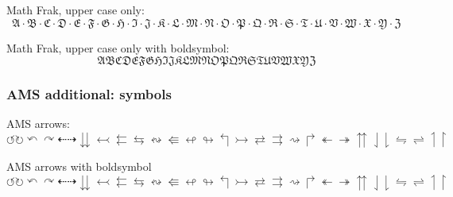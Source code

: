 \documentclass[12pt,a4paper]{article}
\theoremstyle{clearprint}
\begin{document}
\noindent
Math Frak, upper case only:
\begin{equation}
\mathfrak{A} \cdot \mathfrak{B} \cdot \mathfrak{C} \cdot \mathfrak{D} \cdot \mathfrak{E} \cdot \mathfrak{F} \cdot \mathfrak{G} \cdot \mathfrak{H} \cdot \mathfrak{I} \cdot \mathfrak{J} \cdot \mathfrak{K} \cdot \mathfrak{L} \cdot \mathfrak{M} \cdot \mathfrak{N} \cdot \mathfrak{O} \cdot \mathfrak{P} \cdot \mathfrak{Q} \cdot \mathfrak{R} \cdot \mathfrak{S} \cdot \mathfrak{T} \cdot \mathfrak{U} \cdot \mathfrak{V} \cdot \mathfrak{W} \cdot \mathfrak{X} \cdot \mathfrak{Y} \cdot \mathfrak{Z}
\end{equation}

\noindent
Math Frak, upper case only with boldsymbol:
\begin{equation}
\boldsymbol{\mathfrak{A}  \mathfrak{B}  \mathfrak{C}  \mathfrak{D}  \mathfrak{E}  \mathfrak{F}  \mathfrak{G}  \mathfrak{H}  \mathfrak{I}  \mathfrak{J}  \mathfrak{K}  \mathfrak{L}  \mathfrak{M}  \mathfrak{N}  \mathfrak{O}  \mathfrak{P}  \mathfrak{Q}  \mathfrak{R}  \mathfrak{S}  \mathfrak{T}  \mathfrak{U}  \mathfrak{V}  \mathfrak{W}  \mathfrak{X}  \mathfrak{Y}  \mathfrak{Z}}
\end{equation}

\subsubsection[AMS symbols]{AMS additional: symbols}

\noindent 
AMS arrows: %
\begin{equation}
\circlearrowleft \circlearrowright \curvearrowleft \curvearrowright \dashleftarrow \dashrightarrow \downdownarrows \leftarrowtail \leftleftarrows \leftrightarrows \leftrightsquigarrow \Lleftarrow \looparrowleft \looparrowright \Lsh \rightarrowtail \rightleftarrows \rightrightarrows \rightsquigarrow \Rsh \twoheadleftarrow \twoheadrightarrow \upuparrows
\downharpoonleft \downharpoonright \leftrightharpoons \rightleftharpoons \upharpoonleft \upharpoonright
\end{equation}

AMS arrows with boldsymbol
\begin{equation}
\boldsymbol{\circlearrowleft \circlearrowright \curvearrowleft \curvearrowright \dashleftarrow \dashrightarrow \downdownarrows \leftarrowtail \leftleftarrows \leftrightarrows \leftrightsquigarrow \Lleftarrow \looparrowleft \looparrowright \Lsh \rightarrowtail \rightleftarrows \rightrightarrows \rightsquigarrow \Rsh \twoheadleftarrow \twoheadrightarrow \upuparrows
\downharpoonleft \downharpoonright \leftrightharpoons \rightleftharpoons \upharpoonleft \upharpoonright
}
\end{equation}
\end{document}
